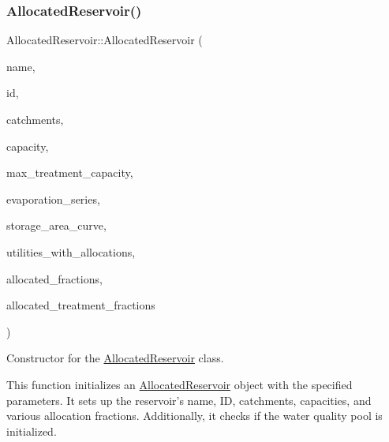 \subsubsection{\texorpdfstring{Allocated\+Reservoir()}{AllocatedReservoir()}\hspace{0.1cm}{\footnotesize\ttfamily [1/5]}}
{\footnotesize\ttfamily Allocated\+Reservoir\+::\+Allocated\+Reservoir (\begin{DoxyParamCaption}\item[{const char $\ast$}]{name,  }\item[{const int}]{id,  }\item[{const vector$<$ \mbox{\hyperlink{classCatchment}{Catchment}} $\ast$$>$ \&}]{catchments,  }\item[{const double}]{capacity,  }\item[{const double}]{max\+\_\+treatment\+\_\+capacity,  }\item[{\mbox{\hyperlink{classEvaporationSeries}{Evaporation\+Series}} \&}]{evaporation\+\_\+series,  }\item[{\mbox{\hyperlink{classDataSeries}{Data\+Series}} $\ast$}]{storage\+\_\+area\+\_\+curve,  }\item[{vector$<$ int $>$ $\ast$}]{utilities\+\_\+with\+\_\+allocations,  }\item[{vector$<$ double $>$ $\ast$}]{allocated\+\_\+fractions,  }\item[{vector$<$ double $>$ $\ast$}]{allocated\+\_\+treatment\+\_\+fractions }\end{DoxyParamCaption})}



Constructor for the \mbox{\hyperlink{classAllocatedReservoir}{Allocated\+Reservoir}} class. 

This function initializes an \mbox{\hyperlink{classAllocatedReservoir}{Allocated\+Reservoir}} object with the specified parameters. It sets up the reservoir’s name, ID, catchments, capacities, and various allocation fractions. Additionally, it checks if the water quality pool is initialized.


